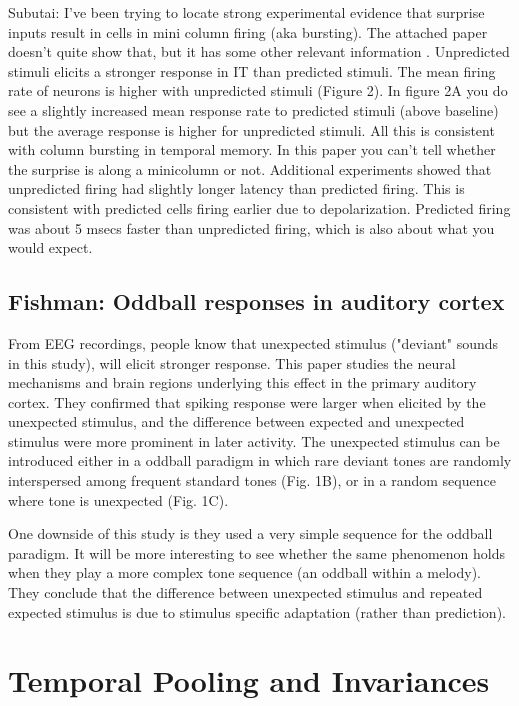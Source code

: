 \documentclass{article} %
\begin{document}
Subutai: I've been trying to locate strong experimental evidence that surprise
inputs result in cells in mini column firing (aka bursting).  The attached paper
doesn't quite show that, but it has some other relevant information
\cite{Meyer2011}.  Unpredicted stimuli elicits a stronger response in IT than
predicted stimuli. The mean firing rate of neurons is higher with unpredicted
stimuli (Figure 2). In figure 2A you do see a slightly increased mean response
rate to predicted stimuli (above baseline) but the average response is higher
for unpredicted stimuli. All this is consistent with column bursting in temporal
memory. In this paper you can't tell whether the surprise is along a minicolumn
or not. Additional experiments showed that unpredicted firing had slightly
longer latency than predicted firing. This is consistent with predicted cells
firing earlier due to depolarization. Predicted firing was about 5 msecs faster
than unpredicted firing, which is also about what you would expect.

\subsection{Fishman: Oddball responses in auditory cortex}
 
From EEG recordings, people know that unexpected stimulus ("deviant" sounds in
this study), will elicit stronger response. This paper \cite{Fishman2012}
studies the neural mechanisms and brain regions underlying this effect in the
primary auditory cortex. They confirmed that spiking response were larger when
elicited by the unexpected stimulus, and the difference between expected and
unexpected stimulus were more prominent in later activity. The unexpected
stimulus can be introduced either in a oddball paradigm in which rare deviant
tones are randomly interspersed among frequent standard tones (Fig. 1B), or in
a random sequence where tone is unexpected (Fig. 1C).

One downside of this study is they used a very simple sequence for the oddball
paradigm. It will be more interesting to see whether the same phenomenon holds
when they play a more complex tone sequence (an oddball within a melody). They
conclude that the difference between unexpected stimulus and repeated expected
stimulus is due to stimulus specific adaptation (rather than prediction).


\section{Temporal Pooling and Invariances}
\end{document}
